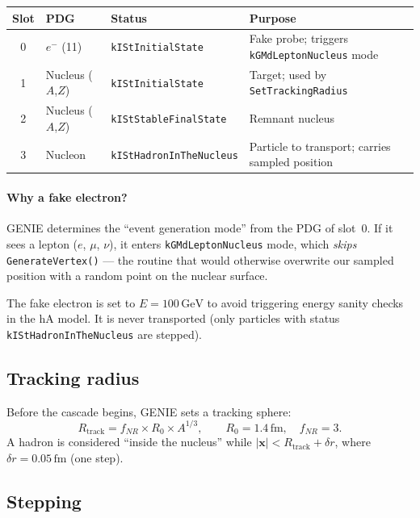 \documentclass[11pt,a4paper]{article}
\newcommand{\vect}[1]{\bm{#1}}
\newcommand{\unit}[1]{\,\mathrm{#1}}
\newcommand{\fm}{\unit{fm}}
\newcommand{\GeV}{\unit{GeV}}
\begin{document}
\begin{center}
\begin{tabular}{clll}
\toprule
Slot & PDG & Status & Purpose \\
\midrule
0 & $e^{-}$ (11) & \texttt{kIStInitialState} &
    Fake probe; triggers \texttt{kGMdLeptonNucleus} mode \\
1 & Nucleus ($A$,$Z$) & \texttt{kIStInitialState} &
    Target; used by \texttt{SetTrackingRadius} \\
2 & Nucleus ($A$,$Z$) & \texttt{kIStStableFinalState} &
    Remnant nucleus \\
3 & Nucleon & \texttt{kIStHadronInTheNucleus} &
    Particle to transport; carries sampled position \\
\bottomrule
\end{tabular}
\end{center}

\paragraph{Why a fake electron?}
GENIE determines the ``event generation mode'' from the PDG of slot~0.
If it sees a lepton ($e$, $\mu$, $\nu$), it enters
\texttt{kGMdLeptonNucleus} mode, which \emph{skips}
\texttt{GenerateVertex()} --- the routine that would otherwise overwrite
our sampled position with a random point on the nuclear surface.

The fake electron is set to $E = 100\GeV$ to avoid triggering energy
sanity checks in the hA model.  It is never transported (only particles
with status \texttt{kIStHadronInTheNucleus} are stepped).

\subsection{Tracking radius}

Before the cascade begins, GENIE sets a tracking sphere:
\begin{equation}
  R_{\text{track}} = f_{NR} \times R_{0} \times A^{1/3},
  \qquad
  R_{0} = 1.4\fm,\quad f_{NR} = 3.
\end{equation}
A hadron is considered ``inside the nucleus'' while
$|\vect{x}| < R_{\text{track}} + \delta r$, where
$\delta r = 0.05\fm$ (one step).

\subsection{Stepping}
\end{document}
